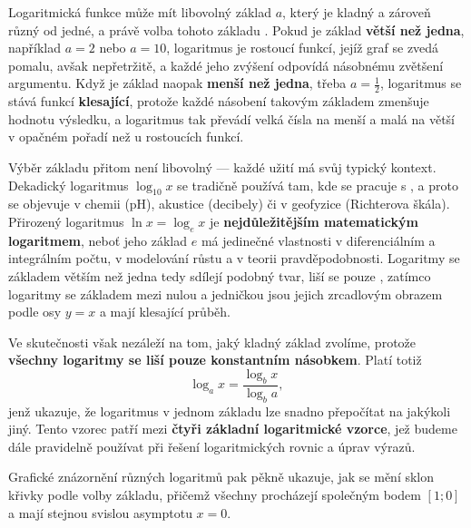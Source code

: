 \documentclass[12pt,a4paper]{article}
\begin{document}
Logaritmická funkce může mít libovolný základ $a$, který je kladný a zároveň různý od jedné, 
a právě volba tohoto základu . 
Pokud je základ \textbf{větší než jedna}, například $a = 2$ nebo $a = 10$, 
logaritmus je rostoucí funkcí, jejíž graf se zvedá pomalu, avšak nepřetržitě, 
a každé jeho zvýšení odpovídá násobnému zvětšení argumentu. 
Když je základ naopak \textbf{menší než jedna}, třeba $a = \tfrac12$, 
logaritmus se stává funkcí \textbf{klesající}, protože každé násobení takovým základem zmenšuje hodnotu výsledku, 
a logaritmus tak převádí velká čísla na menší a malá na větší v opačném pořadí než u rostoucích funkcí.

Výběr základu přitom není libovolný — každé užití má svůj typický kontext. 
Dekadický logaritmus $\log_{10} x$ se tradičně používá tam, kde se pracuje s , 
a proto se objevuje v chemii (pH), akustice (decibely) či v geofyzice (Richterova škála). 
Přirozený logaritmus $\ln x = \log_e x$ je \textbf{nejdůležitějším matematickým logaritmem}, 
neboť jeho základ $e$ má jedinečné vlastnosti v diferenciálním a integrálním počtu, 
v modelování růstu a v teorii pravděpodobnosti. 
Logaritmy se základem větším než jedna tedy sdílejí podobný tvar, 
liší se pouze , 
zatímco logaritmy se základem mezi nulou a jedničkou jsou jejich zrcadlovým obrazem 
podle osy $y = x$ a mají klesající průběh.

Ve skutečnosti však nezáleží na tom, jaký kladný základ zvolíme, 
protože \textbf{všechny logaritmy se liší pouze konstantním násobkem}. 
Platí totiž 
\[
\log_a x = \frac{\log_b x}{\log_b a},
\]
jenž ukazuje, že logaritmus v jednom základu lze snadno přepočítat na jakýkoli jiný. 
Tento vzorec patří mezi \textbf{čtyři základní logaritmické vzorce}, 
jež budeme dále pravidelně používat při řešení logaritmických rovnic a úprav výrazů.

Grafické znázornění různých logaritmů pak pěkně ukazuje, 
jak se mění sklon křivky podle volby základu, přičemž všechny procházejí společným bodem $[1;0]$ 
a mají stejnou svislou asymptotu $x = 0$.
\end{document}
